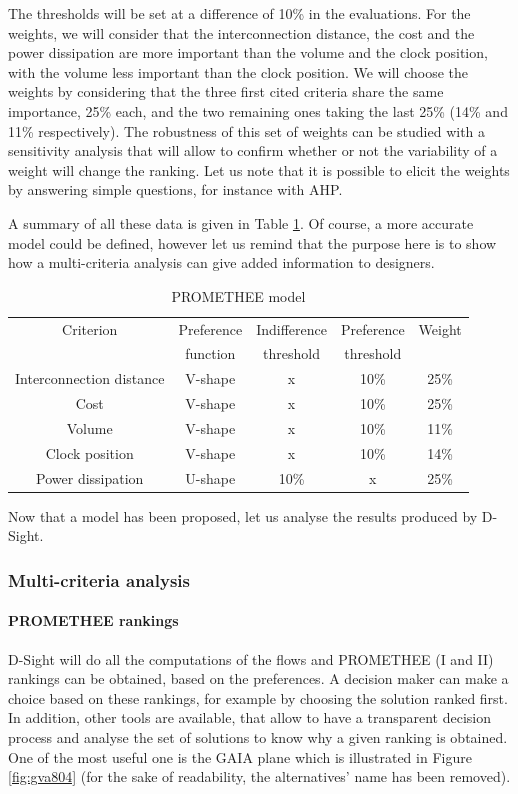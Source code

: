 The thresholds will be set at a difference of 10\% in the evaluations. For the weights, we will consider that the interconnection distance, the cost and the power dissipation are more important than the volume and the clock position, with the volume less important than the clock position. We will choose the weights by considering that the three first cited criteria share the same importance, 25\% each, and the two remaining ones taking the last 25\% (14\% and 11\% respectively). The robustness of this set of weights can be studied with a sensitivity analysis that will allow to confirm whether or not the variability of a weight will change the ranking. Let us note that it is possible to elicit the weights by answering simple questions, for instance with AHP.

A summary of all these data is given in Table \ref{tab:preffunc}. Of course, a more accurate model could be defined, however let us remind that the purpose here is to show how a multi-criteria analysis can give added information to designers.

\begin{table}[h!]
\caption{PROMETHEE model}
\begin{center}
\begin{tabular}{|c|c|c|c|c|}
\hline
Criterion & Preference & Indifference  & Preference & Weight \\
 & function & threshold & threshold & \\
\hline
Interconnection distance & V-shape & x & 10\% & 25\% \\
Cost & V-shape & x & 10\% & 25\% \\
Volume & V-shape & x & 10\% & 11\% \\
Clock position & V-shape & x & 10\% & 14\% \\
Power dissipation & U-shape & 10\% & x & 25\% \\
\hline
\end{tabular}
\end{center}
\label{tab:preffunc}
\end{table}

Now that a model has been proposed, let us analyse the results produced by D-Sight.

\subsubsection{Multi-criteria analysis}

\paragraph{PROMETHEE rankings}
D-Sight will do all the computations of the flows and PROMETHEE (I and II) rankings can be obtained, based on the preferences. A decision maker can make a choice based on these rankings, for example by choosing the solution ranked first. In addition, other tools are available, that allow to have a transparent decision process and analyse the set of solutions to know why a given ranking is obtained. One of the most useful one is the GAIA plane which is illustrated in Figure \ref{fig:gva804} (for the sake of readability, the alternatives' name has been removed).

